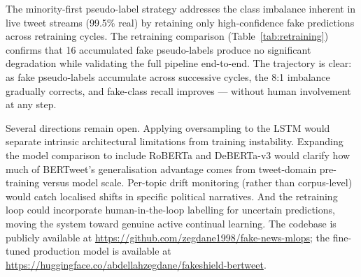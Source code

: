 \documentclass[sigconf]{acmart}
\begin{document}
The minority-first pseudo-label strategy addresses the class imbalance inherent in live tweet
streams (99.5\% real) by retaining only high-confidence fake predictions across retraining
cycles. The retraining comparison (Table~\ref{tab:retraining}) confirms that 16 accumulated
fake pseudo-labels produce no significant degradation while validating the full pipeline
end-to-end. The trajectory is clear: as fake pseudo-labels accumulate across successive
cycles, the 8:1 imbalance gradually corrects, and fake-class recall improves — without
human involvement at any step.

Several directions remain open. Applying oversampling to the LSTM would separate intrinsic
architectural limitations from training instability. Expanding the model comparison to
include RoBERTa and DeBERTa-v3 would clarify how much of BERTweet's generalisation
advantage comes from tweet-domain pre-training versus model scale. Per-topic drift monitoring
(rather than corpus-level) would catch localised shifts in specific political narratives.
And the retraining loop could incorporate human-in-the-loop labelling for uncertain
predictions, moving the system toward genuine active continual learning. The codebase is
publicly available at \url{https://github.com/zegdane1998/fake-news-mlops}; the fine-tuned
production model is available at \url{https://huggingface.co/abdellahzegdane/fakeshield-bertweet}.




\end{document}
